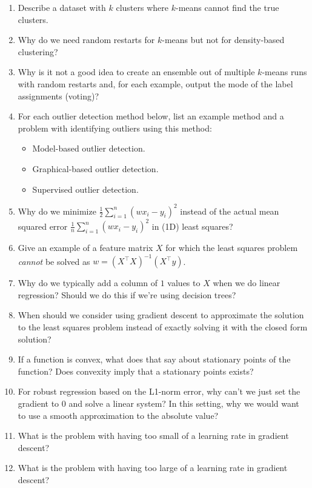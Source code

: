 \documentclass{article}
\begin{document}
\begin{enumerate}
\item Describe a dataset with $k$ clusters where $k$-means cannot find the true clusters.
\item Why do we need random restarts for $k$-means but not for density-based clustering?
\item{Why is it not a good idea to create an ensemble out of multiple $k$-means runs with random restarts and, for each example, output the mode of the label assignments (voting)?}
\item For each outlier detection method below, list an example method and a problem with identifying outliers using this method:
\begin{itemize}
\item Model-based outlier detection.
\item Graphical-based outlier detection.
\item Supervised outlier detection.
\end{itemize}
\item Why do we minimize $\frac{1}{2}\sum_{i=1} ^n (wx_i-y_i)^2$ instead of the actual mean squared error $\frac{1}{n}\sum_{i=1}^n (wx_i-y_i)^2$ in (1D) least squares?
\item Give an example of a feature matrix $X$ for which the least squares problem \emph{cannot} be solved as $w = (X^\top X)^{-1}(X^\top y)$.
\item Why do we typically add a column of $1$ values to $X$ when we do linear regression? Should we do this if we're using decision trees?
\item When should we consider using gradient descent to approximate the solution to the least squares problem instead of exactly solving it with the closed form solution?
\item If a function is convex, what does that say about stationary points of the function? Does convexity imply that a stationary points exists?
\item For robust regression based on the L1-norm error, why can't we just set the gradient to 0 and solve a linear system? In this setting, why we would want to use a smooth approximation to the absolute value?
\item What is the problem with having too small of a learning rate in gradient descent?
\item What is the problem with having too large of a learning rate in gradient descent?
\end{enumerate}
\end{document}
